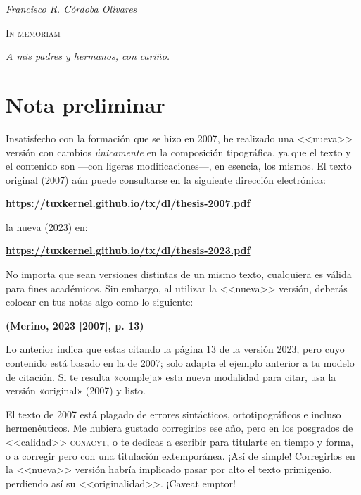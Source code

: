 \documentclass[14pt,twoside,final]{extbook} %
\begin{document}
\newpage
\pagestyle{empty}
\vspace*{48pt}
\begin{flushright}
\textit{Francisco R. Córdoba Olivares}
\end{flushright}
\begin{flushright}
\textsc{In memoriam}
\end{flushright}
\protect\smallskip
\begin{flushright}
\textit{A mis padres y hermanos, con cariño.}
\end{flushright}
\newpage
\pagestyle{empty}
\newpage
\pagestyle{empty}
\chapter*{Nota preliminar}
\label{ch:nota-preliminar}
Insatisfecho con la formación que se hizo en 2007, he realizado una <<nueva>> versión con cambios \emph{únicamente} en la composición tipográfica, ya que el texto y el contenido son ---con ligeras modificaciones---, en esencia, los mismos. El texto original (2007) aún puede consultarse en la siguiente dirección electrónica:
\begin{center}
\href{https://tuxkernel.github.io/tx/dl/thesis-2007.pdf}{\bfseries https://tuxkernel.github.io/tx/dl/thesis-2007.pdf}
\end{center}
la nueva (2023) en:
\begin{center}
\href{https://tuxkernel.github.io/tx/dl/thesis-2023.pdf}{\bfseries https://tuxkernel.github.io/tx/dl/thesis-2023.pdf}
\end{center}
No importa que sean versiones distintas de un mismo texto, cualquiera es válida para fines académicos. Sin embargo, al utilizar la <<nueva>> versión, deberás colocar en tus notas algo como lo siguiente:
\begin{center}
\bfseries (Merino, 2023 [2007], p. 13)
\end{center}
\noindent Lo anterior indica que estas citando la página 13 de la versión 2023, pero cuyo contenido está basado en la de 2007; solo adapta el ejemplo anterior a tu modelo de citación. Si te resulta «compleja» esta nueva modalidad para citar, usa la versión «original» (2007) y listo.

El texto de 2007 está plagado de errores sintácticos, ortotipográficos e incluso hermenéuticos. Me hubiera gustado corregirlos ese año, pero en los posgrados de <<calidad>> \textsc{conacyt}, o te dedicas a escribir para titularte en tiempo y forma, o a corregir pero con una titulación extemporánea. ¡Así de simple! Corregirlos en la <<nueva>> versión habría implicado pasar por alto el texto primigenio, perdiendo así su <<originalidad>>. ¡Caveat emptor!
\end{document}
